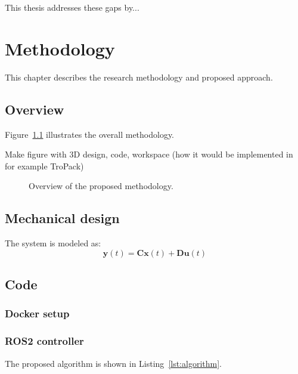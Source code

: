 \documentclass[11pt,a4paper,twoside,openright]{book}
\begin{document}
This thesis addresses these gaps by...

\chapter{Methodology}
\label{ch:methodology}

This chapter describes the research methodology and proposed approach.

\section{Overview}

Figure~\ref{fig:methodology} illustrates the overall methodology.

Make figure with 3D design, code, workspace (how it would be implemented in for example TroPack)

\begin{figure}[htbp]
    \centering
    \caption{Overview of the proposed methodology.}
    \label{fig:methodology}
\end{figure}

\section{Mechanical design}

The system is modeled as:
\begin{equation}
    \mathbf{y}(t) = \mathbf{C}\mathbf{x}(t) + \mathbf{D}\mathbf{u}(t)
    \label{eq:output}
\end{equation}

\section{Code}
\subsection{Docker setup}
\subsection{ROS2 controller}


The proposed algorithm is shown in Listing~\ref{lst:algorithm}.
\end{document}
